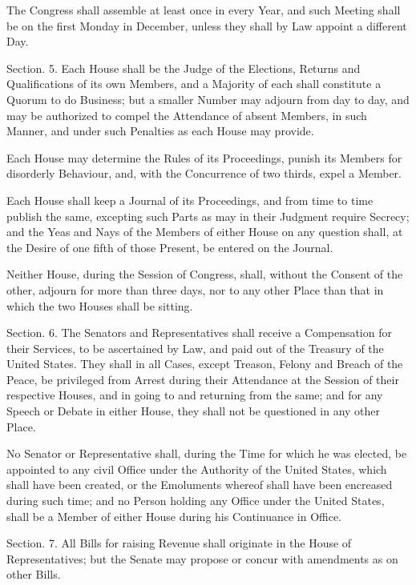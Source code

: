 \documentclass{article}
\begin{document}
The Congress shall assemble at least once in every Year, and such Meeting shall
be on the first Monday in December, unless they shall by Law appoint a different
Day.


Section. 5.  Each House shall be the Judge of the Elections, Returns and
Qualifications of its own Members, and a Majority of each shall constitute a
Quorum to do Business; but a smaller Number may adjourn from day to day, and may
be authorized to compel the Attendance of absent Members, in such Manner, and
under such Penalties as each House may provide.

Each House may determine the Rules of its Proceedings, punish its Members for
disorderly Behaviour, and, with the Concurrence of two thirds, expel a Member.

Each House shall keep a Journal of its Proceedings, and from time to time
publish the same, excepting such Parts as may in their Judgment require Secrecy;
and the Yeas and Nays of the Members of either House on any question shall, at
the Desire of one fifth of those Present, be entered on the Journal.

Neither House, during the Session of Congress, shall, without the Consent of the
other, adjourn for more than three days, nor to any other Place than that in
which the two Houses shall be sitting.


Section. 6.  The Senators and Representatives shall receive a Compensation for
their Services, to be ascertained by Law, and paid out of the Treasury of the
United States. They shall in all Cases, except Treason, Felony and Breach of the
Peace, be privileged from Arrest during their Attendance at the Session of their
respective Houses, and in going to and returning from the same; and for any
Speech or Debate in either House, they shall not be questioned in any other
Place.

No Senator or Representative shall, during the Time for which he was elected, be
appointed to any civil Office under the Authority of the United States, which
shall have been created, or the Emoluments whereof shall have been encreased
during such time; and no Person holding any Office under the United States,
shall be a Member of either House during his Continuance in Office.


Section. 7.  All Bills for raising Revenue shall originate in the House of
Representatives; but the Senate may propose or concur with amendments as on
other Bills.
\end{document}
